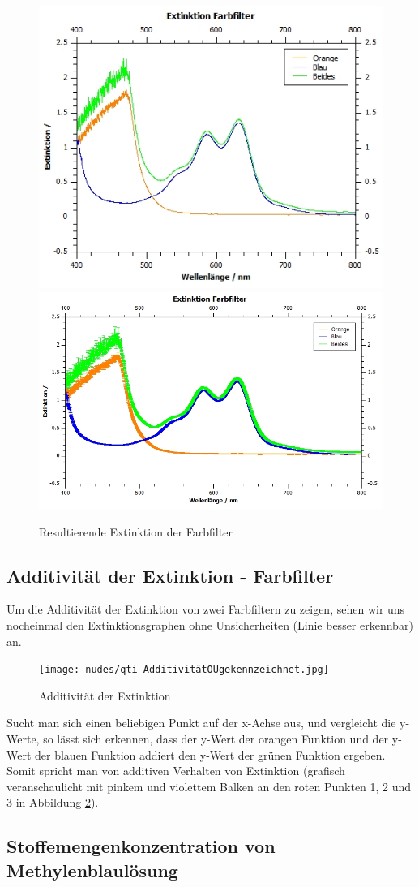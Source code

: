 \documentclass[12pt,a4paper,twoside]{article}
\begin{document}
\begin{figure}[H]
    \centering
    \includegraphics[width=0.4\linewidth]{nudes/qti-Extinktion-FarbfilterOU.jpg}
    \includegraphics[width=0.4\linewidth]{nudes/qti-Extinktion-Farbfilter.jpg}
    \caption{Resultierende Extinktion der Farbfilter}
    \label{fig:ExtinktionFarbfilter}
\end{figure}


\subsection{Additivität der Extinktion - Farbfilter}

Um die Additivität der Extinktion von zwei Farbfiltern zu zeigen, sehen wir uns nocheinmal den Extinktionsgraphen ohne Unsicherheiten (Linie besser erkennbar) an.

\begin{figure}[H]
    \centering
    \texttt{[image: nudes/qti-AdditivitätOUgekennzeichnet.jpg]}
    \caption{Additivität der Extinktion}
    \label{fig:AdditivitätExtinktion}
\end{figure}

\noindent
Sucht man sich einen beliebigen Punkt auf der x-Achse aus, und vergleicht die y-Werte, so lässt sich erkennen, dass der y-Wert der orangen Funktion und der y-Wert der blauen Funktion addiert den y-Wert der grünen Funktion ergeben.
Somit spricht man von additiven Verhalten von Extinktion (grafisch veranschaulicht mit pinkem und violettem Balken an den roten Punkten 1, 2 und 3 in Abbildung \ref{fig:AdditivitätExtinktion}).


\subsection{Stoffemengenkonzentration von Methylenblaulösung}
\end{document}
